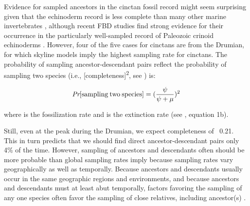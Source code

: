 \documentclass{article}
\begin{document}
Evidence for sampled ancestors in the cinctan fossil record might seem surprising given that the echinoderm record is less complete than many other marine invertebrates \citep{FooteSepkoski1999}, although recent FBD studies find strong evidence for their occurrence in the particularly well-sampled record of Paleozoic crinoid echinoderms \citep{Wright2017jp, WrightToom2017}.  However, four of the five cases for cinctans are from the Drumian, for which skyline models imply the highest sampling rate for cinctans. The probability of sampling ancestor-descendant pairs reflect the probability of sampling two species (i.e., [completeness]\textsuperscript{2}, see \citealp{Foote1996c}) is: 
\begin{center}
\[\textit{Pr}\textrm{[sampling} \: \textrm{two} \: \textrm{species]} = (\frac{\psi}{\psi+\mu})\textsuperscript{2} \]
\end{center}
where \textit{{\textpsi}} is the fossilization rate and \textit{{\textmu}} is the extinction rate (see \citealp{foote1997estimating}, equation 1b).

Still, even at the peak during the Drumian, we expect completeness of ~0.21. This in turn predicts that we should find direct ancestor-descendant pairs only 4\% of the time.  However, sampling of ancestors and descendants often should be more probable than global sampling rates imply because sampling rates vary geographically as well as temporally. Because ancestors and descendants usually occur in the same geographic regions and environments, and because ancestors and descendants must at least abut temporally, factors favoring the sampling of any one species often favor the sampling of close relatives, including ancestor(s) \citep{WagnerErwin1995}. 
\end{document}

